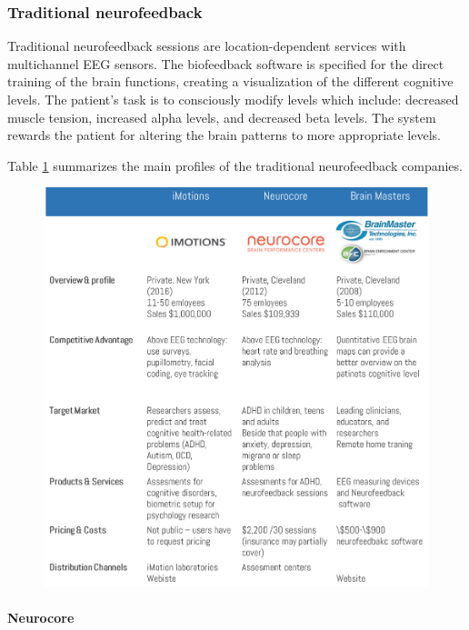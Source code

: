 \documentclass[letterpaper,10pt]{article}
\begin{document}
\subsubsection{Traditional neurofeedback}


Traditional neurofeedback sessions are location-dependent services with multichannel EEG sensors. The biofeedback software is specified for the direct training of the brain functions, creating a visualization of the different cognitive levels. The patient’s task is to consciously modify levels which include: decreased muscle tension, increased alpha levels, and decreased beta levels. The system rewards the patient for altering the brain patterns to more appropriate levels.

Table \ref{img:neurofeedback_tabla} summarizes the main profiles of the traditional neurofeedback companies.

\begin{figure}[h]
\centering
\includegraphics[scale=0.5]{neurofeedback_comp.PNG}
\label{img:neurofeedback_tabla}
\end{figure}

\newpage

\paragraph{Neurocore}
\end{document}
